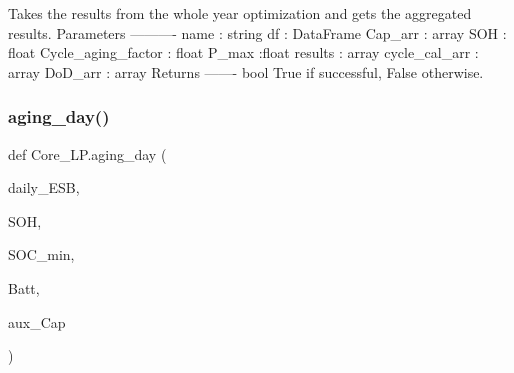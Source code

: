 \begin{DoxyVerb}Takes the results from the whole year optimization and gets the aggregated results.
Parameters
----------
name : string
df : DataFrame
Cap_arr : array
SOH : float
Cycle_aging_factor : float
P_max :float
results : array
cycle_cal_arr : array
DoD_arr : array
Returns
-------
bool
    True if successful, False otherwise.
\end{DoxyVerb}
 \mbox{\label{namespace_core___l_p_ae2add554ee7eb6419d9ec5e4fa2c7b96}} 
\subsubsection{\texorpdfstring{aging\+\_\+day()}{aging\_day()}}
{\footnotesize\ttfamily def Core\+\_\+\+L\+P.\+aging\+\_\+day (\begin{DoxyParamCaption}\item[{}]{daily\+\_\+\+E\+SB,  }\item[{}]{S\+OH,  }\item[{}]{S\+O\+C\+\_\+min,  }\item[{}]{Batt,  }\item[{}]{aux\+\_\+\+Cap }\end{DoxyParamCaption})}


